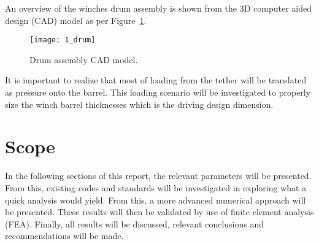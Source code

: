 An overview of the winches drum assembly is shown from the 3D computer aided design (CAD) model as per Figure~\ref{fig:1_drum}.
\begin{figure}[H]
    \centering
    \texttt{[image: 1\_drum]}
    \caption{Drum assembly CAD model.}
    \label{fig:1_drum}
\end{figure}

It is important to realize that most of loading from the tether will be translated as pressure onto the barrel. This loading scenario will be investigated to properly size the winch barrel thicknesses which is the driving design dimension.

\section{Scope} %

In the following sections of this report, the relevant parameters will be presented. From this, existing codes and standards will be investigated in exploring what a quick analysis would yield. From this, a more advanced numerical approach will be presented. These results will then be validated by use of finite element analysis (FEA). Finally, all results will be discussed, relevant conclusions and recommendations will be made.
